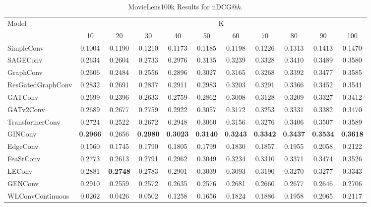 \documentclass{scrartcl}
\begin{document}
\begin{appendices}
\begin{table}[htbp]
    \hspace{-2.3cm}
    \begin{tabular}{|l|*{10}{c|}}
    \hline
    \multirow{2}{*}{Model} & \multicolumn{10}{c|}{K} \\
    \hhline{~*{10}{|-}|}
                             & 10    & 20    & 30    & 40    & 50    & 60    & 70    & 80    & 90    & 100   \\ \hline
    \rowcolor[gray]{0.9} SimpleConv               & 0.1004 & 0.1190 & 0.1210 & 0.1173 & 0.1185 & 0.1198 & 0.1226 & 0.1313 & 0.1413 & 0.1470 \\ 
    SAGEConv                 & 0.2634 & 0.2604 & 0.2733 & 0.2976 & 0.3135 & 0.3239 & 0.3328 & 0.3410 & 0.3489 & 0.3580 \\ 
    \rowcolor[gray]{0.9} GraphConv                & 0.2606 & 0.2484 & 0.2556 & 0.2896 & 0.3027 & 0.3165 & 0.3268 & 0.3392 & 0.3477 & 0.3585 \\ 
    ResGatedGraphConv        & 0.2832 & 0.2691 & 0.2837 & 0.2911 & 0.2983 & 0.3203 & 0.3291 & 0.3366 & 0.3452 & 0.3541 \\ 
    \rowcolor[gray]{0.9} GATConv                  & 0.2699 & 0.2396 & 0.2633 & 0.2759 & 0.2862 & 0.3008 & 0.3128 & 0.3209 & 0.3327 & 0.3412 \\ 
    GATv2Conv                & 0.2689 & 0.2677 & 0.2759 & 0.2922 & 0.3057 & 0.3172 & 0.3253 & 0.3331 & 0.3382 & 0.3470 \\ 
    \rowcolor[gray]{0.9} TransformerConv          & 0.2724 & 0.2522 & 0.2672 & 0.2948 & 0.3060 & 0.3156 & 0.3276 & 0.3406 & 0.3507 & 0.3589 \\ 
    GINConv                  & \textbf{0.2966} & 0.2656 & \textbf{0.2980} & \textbf{0.3023} & \textbf{0.3140} & \textbf{0.3243} & \textbf{0.3342} & \textbf{0.3437} & \textbf{0.3534} & \textbf{0.3618} \\ 
    \rowcolor[gray]{0.9} EdgeConv                 & 0.1560 & 0.1745 & 0.1790 & 0.1805 & 0.1799 & 0.1830 & 0.1857 & 0.1955 & 0.2058 & 0.2122 \\ 
    FeaStConv                & 0.2773 & 0.2613 & 0.2791 & 0.2962 & 0.3049 & 0.3234 & 0.3310 & 0.3371 & 0.3474 & 0.3526 \\ 
    \rowcolor[gray]{0.9} LEConv                   & 0.2881 & \textbf{0.2748} & 0.2783 & 0.2901 & 0.3039 & 0.3093 & 0.3190 & 0.3270 & 0.3277 & 0.3343 \\ 
    GENConv                  & 0.2910 & 0.2559 & 0.2572 & 0.2635 & 0.2576 & 0.2681 & 0.2660 & 0.2677 & 0.2646 & 0.2706 \\ 
    \rowcolor[gray]{0.9} WLConvContinuous         & 0.0262 & 0.0426 & 0.0502 & 0.1258 & 0.1656 & 0.1824 & 0.1886 & 0.1958 & 0.2065 & 0.2117 \\ \hline
    \end{tabular}
    \caption{MovieLens100k Results for nDCG@$k$.}
    \label{tab:ndcg}
\end{table}


\end{appendices}
\end{document}
